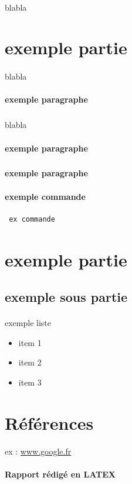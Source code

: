 \documentclass[a4paper,12pt]{article}
\begin{document}
\paragraph{}
blabla

\section{exemple partie}
\paragraph{}
blabla

\paragraph{exemple paragraphe}
\subparagraph{}
blabla

\paragraph{exemple paragraphe}
\subparagraph{}

\paragraph{exemple paragraphe}
\paragraph{}

\paragraph{exemple commande}
\begin{verbatim}
 ex commande
\end{verbatim}

\clearpage
\section{exemple partie}
\subsection{exemple sous partie}
\paragraph{}

exemple liste
\begin{itemize}
\item item 1
\item item 2 
\item item 3
\end{itemize}


\clearpage
\section{Références}

ex :
\url{www.google.fr}\\

\begin{center}
\paragraph{Rapport rédigé en LATEX}
\end{center}
\end{document}
